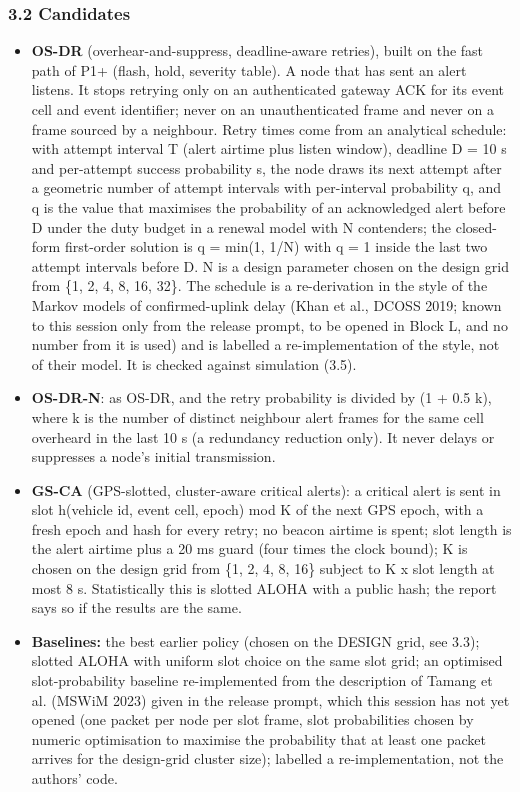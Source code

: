 \subsubsection*{3.2 Candidates}
\begin{itemize}
\item \textbf{OS-DR} (overhear-and-suppress, deadline-aware retries), built on the fast path of P1+ (flash, hold, severity table). A node that has sent an alert listens. It stops retrying only on an authenticated gateway ACK for its event cell and event identifier; never on an unauthenticated frame and never on a frame sourced by a neighbour. Retry times come from an analytical schedule: with attempt interval T (alert airtime plus listen window), deadline D = 10 s and per-attempt success probability s, the node draws its next attempt after a geometric number of attempt intervals with per-interval probability q, and q is the value that maximises the probability of an acknowledged alert before D under the duty budget in a renewal model with N contenders; the closed-form first-order solution is q = min(1, 1/N) with q = 1 inside the last two attempt intervals before D. N is a design parameter chosen on the design grid from \{1, 2, 4, 8, 16, 32\}. The schedule is a re-derivation in the style of the Markov models of confirmed-uplink delay (Khan et al., DCOSS 2019; known to this session only from the release prompt, to be opened in Block L, and no number from it is used) and is labelled a re-implementation of the style, not of their model. It is checked against simulation (3.5).
\item \textbf{OS-DR-N}: as OS-DR, and the retry probability is divided by (1 + 0.5 k), where k is the number of distinct neighbour alert frames for the same cell overheard in the last 10 s (a redundancy reduction only). It never delays or suppresses a node's initial transmission.
\item \textbf{GS-CA} (GPS-slotted, cluster-aware critical alerts): a critical alert is sent in slot h(vehicle id, event cell, epoch) mod K of the next GPS epoch, with a fresh epoch and hash for every retry; no beacon airtime is spent; slot length is the alert airtime plus a 20 ms guard (four times the clock bound); K is chosen on the design grid from \{1, 2, 4, 8, 16\} subject to K x slot length at most 8 s. Statistically this is slotted ALOHA with a public hash; the report says so if the results are the same.
\item \textbf{Baselines:} the best earlier policy (chosen on the DESIGN grid, see 3.3); slotted ALOHA with uniform slot choice on the same slot grid; an optimised slot-probability baseline re-implemented from the description of Tamang et al. (MSWiM 2023) given in the release prompt, which this session has not yet opened (one packet per node per slot frame, slot probabilities chosen by numeric optimisation to maximise the probability that at least one packet arrives for the design-grid cluster size); labelled a re-implementation, not the authors' code.
\end{itemize}


